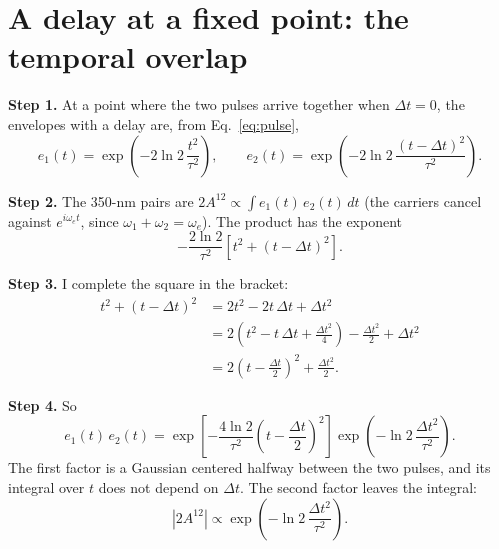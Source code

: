 \documentclass[11pt]{article}
\begin{document}
\section{A delay at a fixed point: the temporal overlap}
\textbf{Step 1.} At a point where the two pulses arrive together when $\Delta t = 0$, the envelopes with a delay
are, from Eq.~\ref{eq:pulse},
\begin{equation}e_1(t) = \exp\!\left(-2\ln 2\,\frac{t^2}{\tau^2}\right),\qquad
e_2(t) = \exp\!\left(-2\ln 2\,\frac{(t-\Delta t)^2}{\tau^2}\right) .\end{equation}

\textbf{Step 2.} The 350-nm pairs are $2A^{12} \propto \int e_1(t)\,e_2(t)\,dt$ (the carriers cancel against
$e^{i\omega_et}$, since $\omega_1 + \omega_2 = \omega_e$). The product has the exponent
\begin{equation}-\frac{2\ln 2}{\tau^2}\left[t^2 + (t-\Delta t)^2\right] .\end{equation}

\textbf{Step 3.} I complete the square in the bracket:
\begin{align}t^2 + (t-\Delta t)^2 &= 2t^2 - 2t\,\Delta t + \Delta t^2\\
&= 2\left(t^2 - t\,\Delta t + \frac{\Delta t^2}{4}\right) - \frac{\Delta t^2}{2} + \Delta t^2\\
&= 2\left(t - \frac{\Delta t}{2}\right)^2 + \frac{\Delta t^2}{2} .\end{align}

\textbf{Step 4.} So
\begin{equation}e_1(t)\,e_2(t) = \exp\!\left[-\frac{4\ln 2}{\tau^2}\left(t - \frac{\Delta t}{2}\right)^2\right]
\exp\!\left(-\ln 2\,\frac{\Delta t^2}{\tau^2}\right) .\end{equation}
The first factor is a Gaussian centered halfway between the two pulses, and its integral over $t$ does not depend
on $\Delta t$. The second factor leaves the integral:
\begin{equation}|2A^{12}| \propto \exp\!\left(-\ln 2\,\frac{\Delta t^2}{\tau^2}\right) .\label{eq:g}\end{equation}
\end{document}
